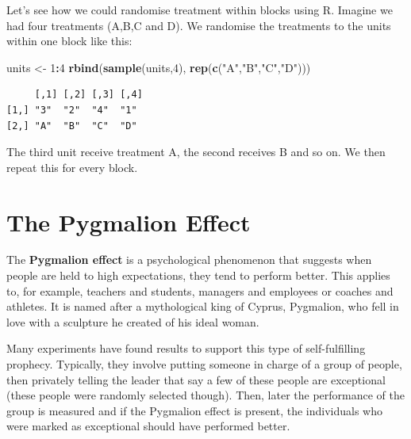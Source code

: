 \documentclass[
  letterpaper,
]{book}
\newenvironment{Shaded}{\begin{snugshade}}{\end{snugshade}}
\newcommand{\DecValTok}[1]{\textcolor[rgb]{0.00,0.00,0.81}{#1}}
\newcommand{\FunctionTok}[1]{\textcolor[rgb]{0.13,0.29,0.53}{\textbf{#1}}}
\newcommand{\NormalTok}[1]{#1}
\newcommand{\OtherTok}[1]{\textcolor[rgb]{0.56,0.35,0.01}{#1}}
\newcommand{\SpecialCharTok}[1]{\textcolor[rgb]{0.81,0.36,0.00}{\textbf{#1}}}
\newcommand{\StringTok}[1]{\textcolor[rgb]{0.31,0.60,0.02}{#1}}
\begin{document}
Let's see how we could randomise treatment within blocks using R.
Imagine we had four treatments (A,B,C and D). We randomise the
treatments to the units within one block like this:

\begin{Shaded}
\begin{Highlighting}[]
\NormalTok{units }\OtherTok{\textless{}{-}} \DecValTok{1}\SpecialCharTok{:}\DecValTok{4}
\FunctionTok{rbind}\NormalTok{(}\FunctionTok{sample}\NormalTok{(units,}\DecValTok{4}\NormalTok{), }\FunctionTok{rep}\NormalTok{(}\FunctionTok{c}\NormalTok{(}\StringTok{"A"}\NormalTok{,}\StringTok{"B"}\NormalTok{,}\StringTok{"C"}\NormalTok{,}\StringTok{"D"}\NormalTok{)))}
\end{Highlighting}
\end{Shaded}

\begin{verbatim}
     [,1] [,2] [,3] [,4]
[1,] "3"  "2"  "4"  "1" 
[2,] "A"  "B"  "C"  "D" 
\end{verbatim}

The third unit receive treatment A, the second receives B and so on. We
then repeat this for every block.

\section{The Pygmalion Effect}\label{the-pygmalion-effect}

The \textbf{Pygmalion effect} is a psychological phenomenon that
suggests when people are held to high expectations, they tend to perform
better. This applies to, for example, teachers and students, managers
and employees or coaches and athletes. It is named after a mythological
king of Cyprus, Pygmalion, who fell in love with a sculpture he created
of his ideal woman.


Many experiments have found results to support this type of
self-fulfilling prophecy. Typically, they involve putting someone in
charge of a group of people, then privately telling the leader that say
a few of these people are exceptional (these people were randomly
selected though). Then, later the performance of the group is measured
and if the Pygmalion effect is present, the individuals who were marked
as exceptional should have performed better.
\end{document}
